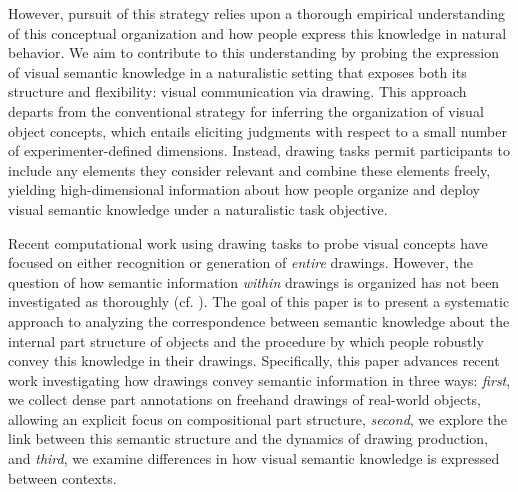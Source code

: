 \documentclass[10pt,letterpaper]{article}
\begin{document}
However, pursuit of this strategy relies upon a thorough empirical understanding of this conceptual organization and how people express this knowledge in natural behavior. 
We aim to contribute to this understanding by probing the expression of visual semantic knowledge in a naturalistic setting that exposes both its structure and flexibility: visual communication via drawing. 
This approach departs from the conventional strategy for inferring the organization of visual object concepts, which entails eliciting judgments with respect to a small number of experimenter-defined dimensions. 
Instead, drawing tasks permit participants to include any elements they consider relevant and combine these elements freely, yielding high-dimensional information about how people organize and deploy visual semantic knowledge under a naturalistic task objective. 

Recent computational work using drawing tasks to probe visual concepts have focused on either recognition \cite{eitz2012humans,yu2017sketch} or generation \cite{ha2017neural,li2019photo} of \textit{entire} drawings. 
However, the question of how semantic information \textit{within} drawings is organized has not been investigated as thoroughly (cf. ).
The goal of this paper is to present a systematic approach to analyzing the correspondence between semantic knowledge about the internal part structure of objects and the procedure by which people robustly convey this knowledge in their drawings. 
Specifically, this paper advances recent work investigating how drawings convey semantic information in three ways: 
\textit{first}, we collect dense part annotations on freehand drawings of real-world objects, allowing an explicit focus on compositional part structure,
\textit{second}, we explore the link between this semantic structure and the dynamics of drawing production,
and \textit{third}, we examine differences in how visual semantic knowledge is expressed between contexts. 

\end{document}
